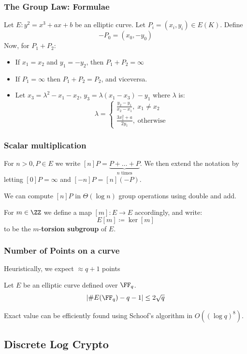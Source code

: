 \documentclass{beamer}
\begin{document}
\begin{frame}
    \frametitle{The Group Law: Formulae}
    Let $E: y^2 = x^3 + a x + b$ be an elliptic curve. Let $P_i = (x_i, y_i) \in E(K)$. 
    \pause
    Define 
    \[ -P_0 = (x_0, -y_0 )\]
    \pause
    Now, for $P_1 + P_2$: 
    \begin{itemize}
        \item<4-> If $x_1 = x_2$ and $y_1 = -y_2$, then $P_1 + P_2 = \infty$
        \item<5-> If $P_1 = \infty$ then $P_1 + P_2 = P_2$, and viceversa.
        \item<6-> Let $x_3 = \lambda^2 - x_1 - x_2$, $y_3 = \lambda(x_1 - x_3) - y_1$ where $\lambda$ is:
        \[ \lambda = \begin{cases}
            \frac{y_2 - y_1}{x_2 - x_1}, \; x_1 \neq x_2 \\
            \frac{3 x_1^2 + a}{2y_1},\; \text{otherwise}
        \end{cases} \]
    \end{itemize}
\end{frame}

\begin{frame}
    \frametitle{Scalar multiplication}
    For $n > 0, P \in E$ we write $[n]P = \underbrace{P + \dots + P}_{n \text{ times}}$. We then extend the notation by letting $[0]P = \infty$ and 
    $[-n]P = [n](-P)$. \\
    \pause

    We can compute $[n]P$ in $\Theta(\log n)$ group operations using double and add.
    
    \pause
    For $m \in \ZZ$ we define a map $[m]: E \to E$ accordingly, and write:
    \[ E[m] \coloneqq \ker[m] \]
    to be the $m$-\textbf{torsion subgroup} of $E$.
\end{frame}

\begin{frame}
    \frametitle{Number of Points on a curve}
    Heuristically, we expect $\approx q + 1$ points
    \pause
    \begin{theorem}[Hasse]
        Let $E$ be an elliptic curve defined over $\FF_q$.
        \[ \left|\#E(\FF_q) - q - 1\right| \leq 2 \sqrt{q} \] 
    \end{theorem}
    \pause
    Exact value can be efficiently found using Schoof's algorithm in $O((\log q)^8)$.
\end{frame}

\subsection{Discrete Log Crypto}
\end{document}
